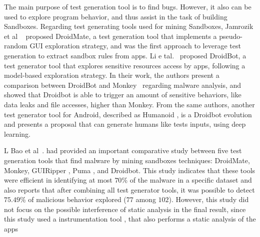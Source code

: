 The main purpose of test generation tool is to find bugs. However, it also can be used to explore program behavior, and thus assist in the task of building Sandboxes. Regarding test generating tools used for mining Sandboxes, Jamrozik et al ~\cite{DBLP:conf/icse/JamrozikZ16} proposed DroidMate, a test generation tool that implements a pseudo-random GUI exploration strategy, and was the first approach to leverage test generation to extract sandbox rules from apps. Li e tal.~\cite{DBLP:conf/icse/LiYGC17} proposed DroidBot, a test generator tool that explores sensitive resources access by apps, following a model-based exploration strategy. In their work, the authors present a comparison between DroidBot and Monkey~\cite{Monkey} regarding malware analysis, and showed that Droidbot is able to trigger an amount of sensitive behaviors, like data leaks and file accesses, higher than Monkey. From the same authors, another test generator tool for Android, described as Humanoid \cite{DBLP:conf/kbse/LiY0C19}, is a Droidbot evolution and presents a proposal that can generate humans like tests inputs, using deep learning.




L Bao et al~.\cite{DBLP:conf/wcre/BaoLL18} had provided an important comparative study between five test generation tools that find malware by mining sandboxes techniques: DroidMate, Monkey, GUIRipper \cite{DBLP:conf/kbse/AmalfitanoFTCM12}, Puma \cite{DBLP:conf/mobisys/Hao0NHG14}, and Droidbot. This study indicates that these tools were efficient in identifying at most $70$\% of the malware in a specific dataset and also reports that after combining all test generator tools, it was possible to detect $75.49$\% of malicious behavior explored ($77$ among $102$). However, this study did not focus on the possible interference of static analysis in the final result, since this study used a instrumentation tool \cite{DBLP:conf/icsm/CaiR17a}, that also performs a static analysis of the apps 

